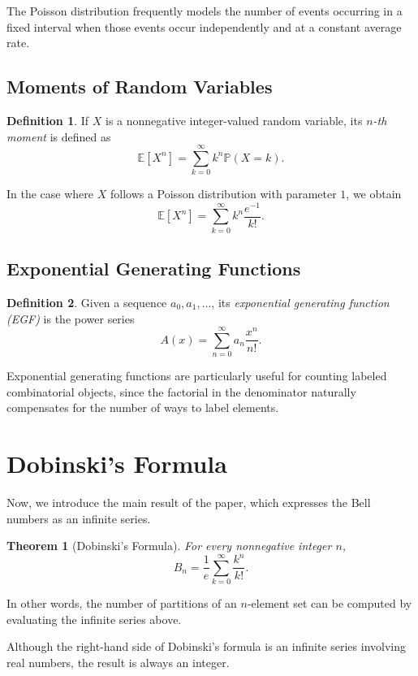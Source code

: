 \documentclass[12pt]{amsart}
\theoremstyle{plain}
\newtheorem{theorem}{Theorem}[section]
\theoremstyle{definition}
\newtheorem{definition}{Definition}[section]
\theoremstyle{remark}
\newcommand{\PP}{\mathbb{P}}
\newcommand{\EE}{\mathbb{E}}
\begin{document}
The Poisson distribution frequently models the number of events occurring in a fixed interval when those events occur independently and at a constant average rate.

\subsection{Moments of Random Variables}

\begin{definition}
If $X$ is a nonnegative integer-valued random variable, its $n$\emph{-th moment} is defined as
$$\EE[X^n] = \sum_{k = 0}^\infty k^n\PP(X = k).$$
\end{definition}

In the case where $X$ follows a Poisson distribution with parameter $1$, we obtain
$$\EE[X^n] = \sum_{k = 0}^\infty k^n \frac{e^{-1}}{k!}.$$

\subsection{Exponential Generating Functions}

\begin{definition}
Given a sequence $a_0, a_1, \ldots$, its \emph{exponential generating function (EGF)} is the power series
$$A(x) = \sum_{n = 0}^\infty a_n \frac{x^n}{n!}.$$
\end{definition}

Exponential generating functions are particularly useful for counting labeled combinatorial objects, since the factorial in the denominator naturally compensates for the number of ways to label elements.

\section{Dobinski's Formula}
Now, we introduce the main result of the paper, which expresses the Bell numbers as an infinite series.

\begin{theorem}[Dobinski's Formula]
For every nonnegative integer $n$,
$$B_n = \frac{1}{e}\sum_{k = 0}^\infty \frac{k^n}{k!}.$$
\end{theorem}

In other words, the number of partitions of an $n$-element set can be computed by evaluating the infinite series above.

Although the right-hand side of Dobinski's formula is an infinite series involving real numbers, the result is always an integer.
\end{document}
